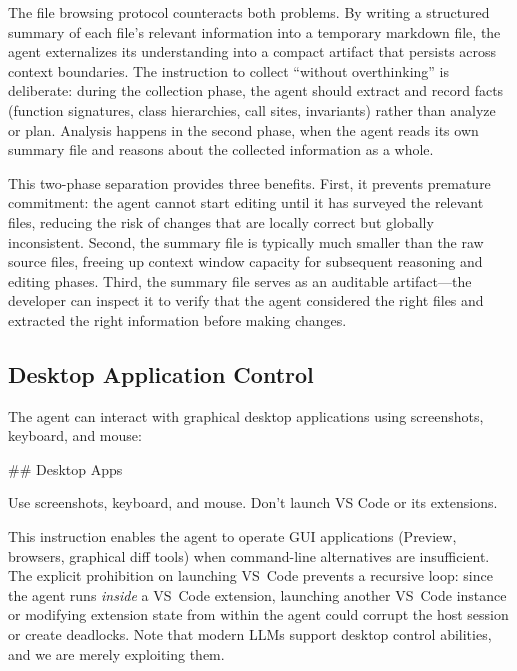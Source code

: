 \documentclass{article}
\begin{document}
The file browsing protocol counteracts both problems.  By writing a structured summary of each file's relevant information into a temporary markdown file, the agent externalizes its understanding into a compact artifact that persists across context boundaries.  The instruction to collect ``without overthinking'' is deliberate: during the collection phase, the agent should extract and record facts (function signatures, class hierarchies, call sites, invariants) rather than analyze or plan.  Analysis happens in the second phase, when the agent reads its own summary file and reasons about the collected information as a whole.

This two-phase separation provides three benefits.  First, it prevents premature commitment: the agent cannot start editing until it has surveyed the relevant files, reducing the risk of changes that are locally correct but globally inconsistent.  Second, the summary file is typically much smaller than the raw source files, freeing up context window capacity for subsequent reasoning and editing phases.  Third, the summary file serves as an auditable artifact---the developer can inspect it to verify that the agent considered the right files and extracted the right information before making changes.

\subsection{Desktop Application Control}

The agent can interact with graphical desktop applications using screenshots, keyboard, and mouse:

\begin{prompt}
## Desktop Apps

Use screenshots, keyboard, and mouse. Don't launch VS Code or its extensions.
\end{prompt}

\noindent This instruction enables the agent to operate GUI applications (Preview, browsers, graphical diff tools) when command-line alternatives are insufficient.  The explicit prohibition on launching VS~Code prevents a recursive loop: since the agent runs \emph{inside} a VS~Code extension, launching another VS~Code instance or modifying extension state from within the agent could corrupt the host session or create deadlocks.  Note that modern LLMs support desktop control abilities, and we are merely exploiting them.
\end{document}
